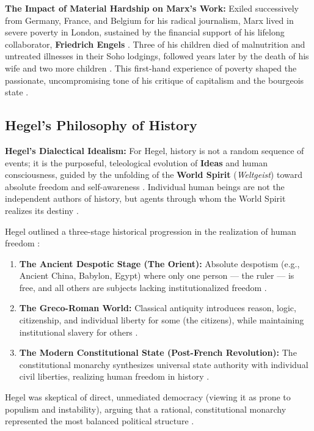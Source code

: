\begin{CriticalPoint}
\textbf{The Impact of Material Hardship on Marx's Work:}
Exiled successively from Germany, France, and Belgium for his radical journalism, Marx lived in severe poverty in London, sustained by the financial support of his lifelong collaborator, \textbf{Friedrich Engels} . Three of his children died of malnutrition and untreated illnesses in their Soho lodgings, followed years later by the death of his wife and two more children . This first-hand experience of poverty shaped the passionate, uncompromising tone of his critique of capitalism and the bourgeois state .
\end{CriticalPoint}

\subsection{Hegel's Philosophy of History}

\begin{KeyConcept}
\textbf{Hegel's Dialectical Idealism:}
For Hegel, history is not a random sequence of events; it is the purposeful, teleological evolution of \textbf{Ideas} and human consciousness, guided by the unfolding of the \textbf{World Spirit} (\textit{Weltgeist}) toward absolute freedom and self-awareness . Individual human beings are not the independent authors of history, but agents through whom the World Spirit realizes its destiny .
\end{KeyConcept}

Hegel outlined a three-stage historical progression in the realization of human freedom :
\begin{enumerate}
    \item \textbf{The Ancient Despotic Stage (The Orient):} Absolute despotism (e.g., Ancient China, Babylon, Egypt) where only one person --- the ruler --- is free, and all others are subjects lacking institutionalized freedom .
    \item \textbf{The Greco-Roman World:} Classical antiquity introduces reason, logic, citizenship, and individual liberty for some (the citizens), while maintaining institutional slavery for others .
    \item \textbf{The Modern Constitutional State (Post-French Revolution):} The constitutional monarchy synthesizes universal state authority with individual civil liberties, realizing human freedom in history .
\end{enumerate}

\begin{DataFact}
Hegel was skeptical of direct, unmediated democracy (viewing it as prone to populism and instability), arguing that a rational, constitutional monarchy represented the most balanced political structure .
\end{DataFact}

